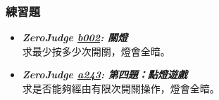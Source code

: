\subsubsection*{練習題}
\begin{itemize}[label={\Checkmark}]
\item \textbf{\textit{ZeroJudge \href{http://zerojudge.tw/ShowProblem?problemid=b002}{b002}: 關燈}}\\
求最少按多少次開關，燈會全暗。
\item \textbf{\textit{ZeroJudge \href{http://zerojudge.tw/ShowProblem?problemid=a243}{a243}: 第四題：點燈遊戲}}\\
求是否能夠經由有限次開關操作，燈會全暗。
\end{itemize}